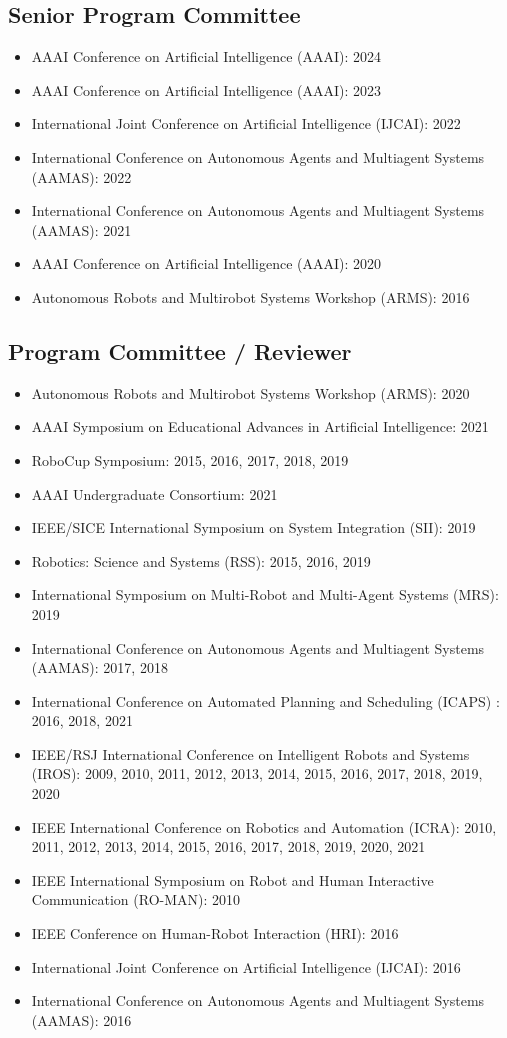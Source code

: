 \documentclass[Times]{article}
\begin{document}
\subsection*{Senior Program Committee}
\begin{itemize}
  \item AAAI Conference on Artificial Intelligence (AAAI): 2024
  \item AAAI Conference on Artificial Intelligence (AAAI): 2023
  \item International Joint Conference on Artificial Intelligence (IJCAI): 2022
  \item International Conference on Autonomous Agents and Multiagent Systems
  (AAMAS): 2022
  \item International Conference on Autonomous Agents and Multiagent Systems
  (AAMAS): 2021
  \item AAAI Conference on Artificial Intelligence (AAAI): 2020
  \item Autonomous Robots and Multirobot Systems Workshop (ARMS): 2016
\end{itemize}

\subsection*{Program Committee / Reviewer}
\begin{itemize}
 \item Autonomous Robots and Multirobot Systems Workshop (ARMS): 2020
 \item AAAI Symposium on Educational Advances in Artificial Intelligence: 2021
 \item RoboCup Symposium: 2015, 2016, 2017, 2018, 2019
 \item AAAI Undergraduate Consortium: 2021
 \item IEEE/SICE International Symposium on System Integration (SII): 2019
 \item Robotics: Science and Systems (RSS): 2015, 2016, 2019
 \item International Symposium on Multi-Robot and Multi-Agent Systems (MRS): 2019
 \item International Conference on Autonomous Agents and Multiagent Systems
(AAMAS): 2017, 2018
\item International Conference on Automated Planning and Scheduling (ICAPS)
 : 2016, 2018, 2021
 \item IEEE/RSJ International Conference on Intelligent Robots and Systems
(IROS): 2009, 2010, 2011, 2012, 2013, 2014, 2015, 2016, 2017, 2018, 2019, 2020
\item IEEE International Conference on Robotics and Automation (ICRA): 2010,
  2011, 2012, 2013, 2014, 2015, 2016, 2017, 2018, 2019, 2020, 2021
\item IEEE International Symposium on Robot and Human Interactive Communication
  (RO-MAN): 2010
 \item IEEE Conference on Human-Robot Interaction (HRI): 2016
 \item International Joint Conference on Artificial Intelligence (IJCAI): 2016
 \item International Conference on Autonomous Agents and Multiagent Systems
(AAMAS): 2016
\end{itemize}
\end{document}
